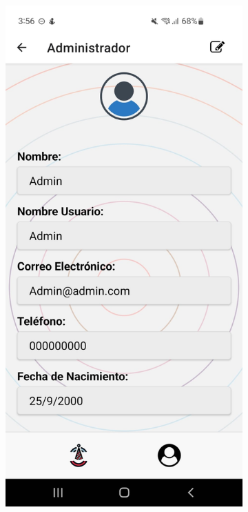 \clearpage
\vspace*{\fill}
\begin{figure}[H]
    \centering
    \begin{subfigure}{0.45\textwidth}
        \centering
        \includegraphics[width=\linewidth]{imagenes/Capturas/DatosPerfilAdmin.jpeg}

\end{subfigure}
\end{figure}
